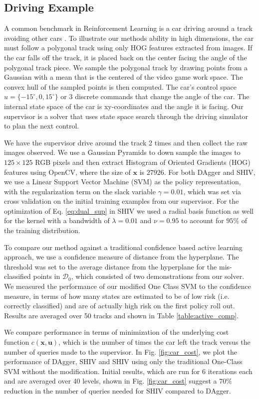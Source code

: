 \documentclass[10pt, conference]{ieeeconf}      %
\newcommand{\bu}{\mathbf{u}}
\newcommand{\bx}{\mathbf{x}}
\begin{document}
\subsection{Driving Example}
A common benchmark in Reinforcement Learning  is a car driving around a track avoiding other cars \cite{argall2009survey}. To illustrate our methods ability in high dimensions, the car must follow a polygonal track using only HOG features extracted from images. If the car falls off the track, it is placed back on the center facing the angle of the polygonal track piece. We sample the polygonal track by drawing points from a Gaussian with a mean that is the centered of the video game work space. The convex hull of the sampled points is then computed. The car's control space $u = \lbrace -15^\circ, 0, 15^\circ \rbrace$ or 3 discrete commands that change the angle of the car. The internal state space of the car is xy-coordinates and the angle it is facing. Our supervisor is a solver that uses state space search through the driving simulator to plan the next control.

We have the supervisor drive around the track 2 times and then collect the raw images observed. We use a Gaussian Pyramids to down sample the images to $125 \times 125$ RGB pixels and then extract Histogram of Oriented Gradients (HOG) features using OpenCV,  where the size of $\bx$ is $27926$. For both DAgger and SHIV, we use a Linear Support Vector Machine (SVM) as the policy representation, with the regularization term on the slack variable $\gamma=0.01$, which was set via cross validation on the initial training examples from our supervisor. For the optimization of Eq. \ref{eq:dual_sup} in SHIV we used a radial basis function as well for the kernel with a bandwidth of $\lambda=0.01$ and $\nu = 0.95$ to account for $95\%$ of the training distribution. 

To compare our method against a traditional confidence based active learning approach, we use a confidence measure  of distance from the hyperplane. The threshold was set to the average distance from the hyperplane for the mis-classified points in $\mathcal{D}_0$, which consisted of two demonstrations from our solver. We measured the performance of our modified One Class SVM to the confidence measure, in terms of how many states are estimated to be of low risk (i.e. correctly classified) and are of actually high risk on the first policy roll out. Results  are averaged over 50 tracks and shown in Table \ref{table:active_comp}. 


We compare performance in terms of minimization of the underlying cost function $c(\bx,\bu)$, which is the  number of times the car left the track versus the number of queries made to the supervisor. In Fig. \ref{fig:car_cost}, we plot the performance of DAgger, SHIV and SHIV using only the traditional One-Class SVM without the modification.  Initial results, which are run for 6 iterations each and are averaged over 40 levels, shown in Fig. \ref{fig:car_cost} suggest a $70\%$ reduction in the number of queries needed for SHIV compared to DAgger. 
 
\end{document}
